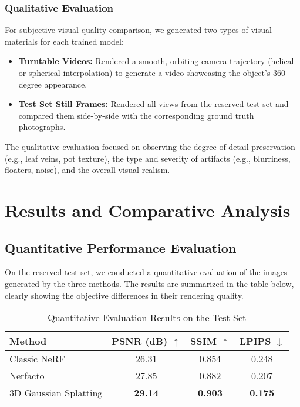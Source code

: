 \documentclass[11pt]{article}
\begin{document}
\subsubsection{Qualitative Evaluation}
For subjective visual quality comparison, we generated two types of visual materials for each trained model:
\begin{itemize}
    \item \textbf{Turntable Videos:} Rendered a smooth, orbiting camera trajectory (helical or spherical interpolation) to generate a video showcasing the object's 360-degree appearance.
    \item \textbf{Test Set Still Frames:} Rendered all views from the reserved test set and compared them side-by-side with the corresponding ground truth photographs.
\end{itemize}
The qualitative evaluation focused on observing the degree of detail preservation (e.g., leaf veins, pot texture), the type and severity of artifacts (e.g., blurriness, floaters, noise), and the overall visual realism.

\section{Results and Comparative Analysis}

\subsection{Quantitative Performance Evaluation}
On the reserved test set, we conducted a quantitative evaluation of the images generated by the three methods. The results are summarized in the table below, clearly showing the objective differences in their rendering quality.

\begin{table}[h!]
\centering
\caption{Quantitative Evaluation Results on the Test Set}
\label{tab:quant_results}
\begin{tabular}{|l|c|c|c|}
\hline
\textbf{Method} & \textbf{PSNR (dB) $\uparrow$} & \textbf{SSIM $\uparrow$} & \textbf{LPIPS $\downarrow$} \\ \hline
Classic NeRF & 26.31 & 0.854 & 0.248 \\ \hline
Nerfacto & 27.85 & 0.882 & 0.207 \\ \hline
3D Gaussian Splatting & \textbf{29.14} & \textbf{0.903} & \textbf{0.175} \\ \hline
\end{tabular}
\end{table}
\end{document}
